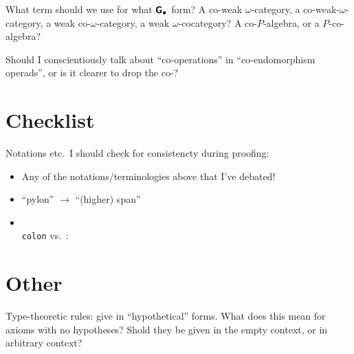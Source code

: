 \documentclass{amsart}
\begin{document}
\para What term should we use for what $\textsf{\textbf{G}}_\bullet$ form?  A co-weak $\omega$-category, a co-weak-$\omega$-category, a weak co-$\omega$-category, a weak $\omega$-cocategory?  A co-$P$-algebra, or a $P$-co-algebra?

\para Should I conscientiously talk about ``co-operations'' in ``co-endomorphism operads'', or is it clearer to drop the co-?

\section{Checklist}  Notations etc.\ I should check for consistencty during proofing:
\begin{itemize}
\item Any of the notations/terminologies above that I've debated!
\item ``pylon'' $\longrightarrow$ ``(higher) span''
\item \texttt{\\colon} vs.\ :
\end{itemize}

\section{Other}

\para Type-theoretic rules: give in ``hypothetical'' forms.  What does this mean for axioms with no hypotheses?  Shold they be given in the empty context, or in arbitrary context? 
\end{document}
